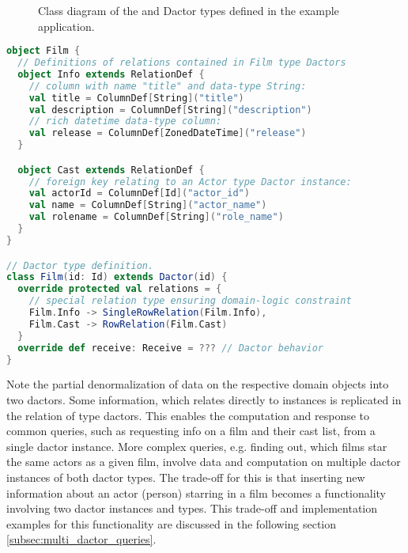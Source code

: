 \begin{figure}\label{fig:dactor_diagram}
  \centering
  
  \caption{Class diagram of the  and  Dactor types defined in the example application.}
\end{figure}

\begin{lstlisting}[caption=Film Dactor type definition using the actordb framework, label=lst:film_definition, language=Scala]
object Film {
  // Definitions of relations contained in Film type Dactors
  object Info extends RelationDef {
    // column with name "title" and data-type String:
    val title = ColumnDef[String]("title")
    val description = ColumnDef[String]("description")
    // rich datetime data-type column:
    val release = ColumnDef[ZonedDateTime]("release")
  }

  object Cast extends RelationDef {
    // foreign key relating to an Actor type Dactor instance:
    val actorId = ColumnDef[Id]("actor_id")
    val name = ColumnDef[String]("actor_name")
    val rolename = ColumnDef[String]("role_name")
  }
} 

// Dactor type definition.
class Film(id: Id) extends Dactor(id) {
  override protected val relations = {
    // special relation type ensuring domain-logic constraint
    Film.Info -> SingleRowRelation(Film.Info),
    Film.Cast -> RowRelation(Film.Cast)
  }
  override def receive: Receive = ??? // Dactor behavior
}
\end{lstlisting}
%

Note the partial denormalization of data on the respective domain objects into two \glspl{dactor}.
Some information, which relates directly to  instances is replicated in the  \gls{relation} of  type \glspl{dactor}.
This enables the computation and response to common queries, such as requesting info on a film and their cast list, from a single \gls{dactor} instance.
More complex queries, e.g. finding out, which films star the same actors as a given film, involve data and computation on multiple \gls{dactor} instances of both \gls{dactor} types.
The trade-off for this is that inserting new information about an actor (person) starring in a film becomes a functionality involving two \gls{dactor} instances and types.
This trade-off and implementation examples for this functionality are discussed in the following section \ref{subsec:multi_dactor_queries}.


